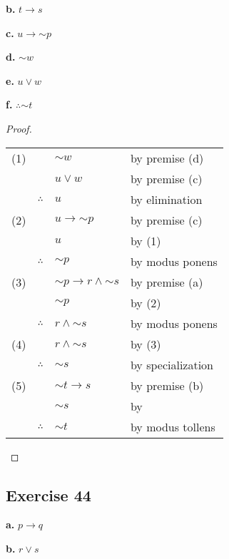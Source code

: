 \documentclass[14pt]{extarticle}
\begin{document}
{\bf b.} $t \to s$

{\bf c.} $u \to {\sim p}$

{\bf d.} ${\sim w}$

{\bf e.} $u \vee w$

{\bf f.} $\therefore {\sim t}$

\begin{proof}
    \begin{tabular}{rrll}
        (1) &              & ${\sim w}$                       & by premise (d)    \\
            &              & $u \vee w$                       & by premise (c)    \\
            & $\therefore$ & $u$                              & by elimination    \\
        (2) &              & $u \to {\sim p}$                 & by premise (c)    \\
            &              & $u$                              & by (1)            \\ & $\therefore$ & ${\sim p}$ & by modus ponens \\
        (3) &              & ${\sim p} \to r \wedge {\sim s}$ & by premise (a)    \\
            &              & ${\sim p}$                       & by (2)            \\
            & $\therefore$ & $r \wedge {\sim s}$              & by modus ponens   \\
        (4) &              & $r \wedge {\sim s}$              & by (3)            \\
            & $\therefore$ & ${\sim s}$                       & by specialization \\
        (5) &              & ${\sim t} \to s$                 & by premise (b)    \\
            &              & ${\sim s}$                       & by                \\
            & $\therefore$ & ${\sim t}$                       & by modus tollens  \\
    \end{tabular}
\end{proof}

\subsection{Exercise 44}
{\bf a.} $p \to q$

{\bf b.} $r \vee s$
\end{document}
